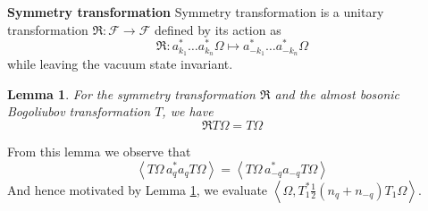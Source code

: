 \documentclass[sn-mathphys,Numbered, a4paper ,nocrop]{sn-jnl}%
\newcommand{\half}{\frac{1}{2}}
\newcommand{\eva}[1]{\left\langle #1 \right\rangle}
\theoremstyle{plain}
\newtheorem{lemma}[theorem]{Lemma}
\theoremstyle{definition}
\theoremstyle{remark}
\theoremstyle{plain}
\theoremstyle{definition}
\theoremstyle{remark}
\begin{document}
\textbf{Symmetry transformation} Symmetry transformation is a unitary transformation $\mathfrak{R}:\mathcal{F}\rightarrow \mathcal{F}$ defined by its action as
\begin{equation}
    \mathfrak{R}: a^*_{k_1}\ldots a^*_{k_n}\Omega \mapsto a^*_{-k_1}\ldots a^*_{-k_n}\Omega 
\end{equation}
while leaving the vacuum state invariant.

\begin{lemma}\label{lem:symtransformation}
    For the symmetry transformation $\mathfrak{R}$ and the almost bosonic Bogoliubov transformation $T$, we have
    \begin{equation}
        \mathfrak{R}T\Omega = T\Omega
    \end{equation}
\end{lemma}
From this lemma we observe that 
\begin{equation}
    \eva{T\Omega\, a^*_qa_qT\Omega} = \eva{T\Omega\, a^*_{-q}a_{-q}T\Omega}
\end{equation}
And hence motivated by Lemma \ref{lem:symtransformation}, we evaluate $\eva{\Omega, T_1^*\half\left(n_q+n_{-q}\right)T_1\Omega}$.\newline 
\end{document}
